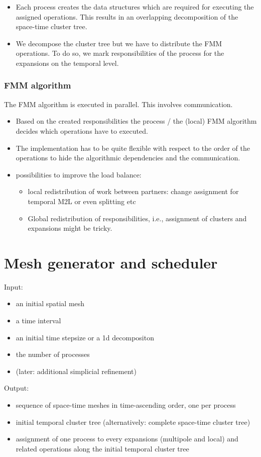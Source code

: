 \documentclass[a4paper]{scrartcl}
\begin{document}
\begin{itemize}
\item Each process creates the data structures which are required for executing the
  assigned operations. This results in an overlapping decomposition of the
  space-time cluster tree.
\item We decompose the cluster tree but we have to distribute the FMM operations.
  To do so, we mark responsibilities of the process for the expansions on the
  temporal level.
\end{itemize}

\subsubsection{FMM algorithm}
The FMM algorithm is executed in parallel. This involves communication.
\begin{itemize}
  \item Based on the created responsibilities the process / the (local) FMM algorithm
    decides which operations have to executed.   
\item The implementation has to be quite flexible with respect to the order of
  the operations to hide the algorithmic dependencies and the
  communication.
\item possibilities to improve the load balance:
  \begin{itemize}
   \item local redistribution of work between partners: change assignment for
     temporal M2L or even splitting etc 
   \item Global redistribution of responsibilities, i.e., assignment of clusters
     and expansions might be tricky.
  \end{itemize}
\end{itemize}


\section{Mesh generator and scheduler}

Input:
\begin{itemize}
\item  an initial spatial mesh
\item a time interval
\item an initial time stepsize or a 1d decompositon
\item the number of processes
\item (later: additional simplicial refinement)
\end{itemize}
Output:
\begin{itemize}
\item sequence of space-time meshes in time-ascending order, one per process
\item initial temporal cluster tree (alternatively: complete space-time cluster tree)
\item assignment of one process to every expansions (multipole and local) and
  related operations along the initial temporal cluster tree 
\end{itemize}
\end{document}
